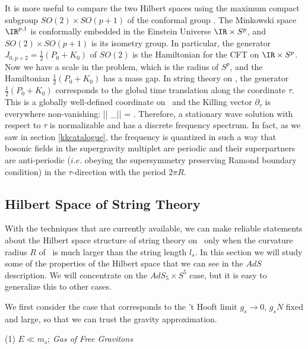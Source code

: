 It is more useful to compare the two Hilbert spaces using the maximum compact
subgroup $SO(2) \times SO(p+1)$ of the conformal group \cite{Horowitz:1998bj}. 
The Minkowski space $\IR^{p,1}$ is conformally embedded in 
the Einstein Universe $\IR \times S^p$, 
and $SO(2) \times SO(p+1)$ is its isometry group. 
In particular, the generator $J_{0,p+2}=\frac{1}{2}(P_0 + K_0)$
of $SO(2)$ is the Hamiltonian 
for the CFT on $\IR \times S^p$. Now we have a scale in the problem, 
which is the radius of $S^p$, and the Hamiltonian $\frac{1}{2}(P_0 + K_0)$
has a mass gap. In string theory on \adsp , 
the generator $\frac{1}{2}(P_0 + K_0)$ corresponds to the global 
time translation 
along the coordinate $\tau$. This is a globally well-defined
coordinate on \ads\ and the Killing vector $\partial_\tau$
is everywhere non-vanishing:
\beq
  || \partial_\tau || = . 
\eeq
Therefore, a stationary wave solution with respect to $\tau$
is normalizable and has a discrete frequency spectrum.  
In fact, as we saw in section \ref{kkcatalogue}, the frequency
is quantized in such a way that bosonic fields in the
supergravity multiplet are periodic and their superpartners 
are anti-periodic ($i.e.$ obeying the supersymmetry preserving
Ramond boundary condition) in the $\tau$-direction
with the period $2\pi R$.

\subsection{Hilbert Space of String Theory}

With the techniques that  are currently available, 
we can make reliable  statements 
about the Hilbert space structure of  string theory on \ads\ 
only when the curvature radius $R$ of \ads\ is 
much larger than the string length $l_s$. 
In this section we will study some of the properties of the 
Hilbert space that we can see in the $AdS$ description. We will 
concentrate on the $AdS_5 \times S^5$ case, but it is easy to
 generalize this  to other cases.

We first consider the case that corresponds to the 't Hooft limit
$g_s \to 0 $, $g_s N$ fixed and large, so that we can trust the gravity 
approximation. 





\medskip
\noindent
(1) $E \ll  m_s $; {\it Gas of Free Gravitons}

\smallskip

